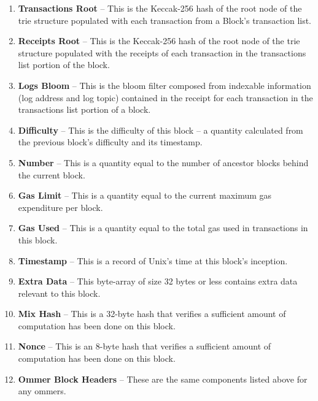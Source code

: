 \documentclass[10pt,a4paper,leqno,bibliography=totoc]{scrartcl}
\newenvironment{alphafootnotes}
{\par\edef\savedfootnotenumber{\number\value{footnote}}
\renewcommand{\thefootnote}{\alph{footnote}}
\setcounter{footnote}{0}}
{\par\setcounter{footnote}{\savedfootnotenumber}}
\begin{document}
\begin{alphafootnotes}
\begin{multicols*}{2}
\begin{enumerate}
					\item \textbf{Transactions Root} -- This is the Keccak-256 hash of the root node of the trie structure populated with each transaction from a Block's transaction list.
					\item \textbf{Receipts Root} -- This is the Keccak-256 hash of the root node of the trie structure populated with the receipts of each transaction in the transactions list portion of the block.
					\item \textbf{Logs Bloom} -- This is the bloom filter composed from indexable information (log address and log topic) contained in the receipt for each transaction in the transactions list portion of a block.
					\item \textbf{Difficulty} -- This is the difficulty of this block -- a quantity calculated from the previous block's difficulty and its timestamp.

					\item \textbf{Number} -- This is a quantity equal to the number of ancestor blocks behind the current block.
					\item \textbf{Gas Limit} -- This is a quantity equal to the current maximum gas expenditure per block.
					\item \textbf{Gas Used} -- This is a quantity equal to the total gas used in transactions in this block.
					\item \textbf{Timestamp} -- This is a record of Unix's time at this block's inception.
					

					\item \textbf{Extra Data} -- This byte-array of size 32 bytes or less contains extra data relevant to this block.
					\item \textbf{Mix Hash} -- This is a 32-byte hash that verifies a sufficient amount of computation has been done on this block.
					\item \textbf{Nonce} -- This is an 8-byte hash that verifies a sufficient amount of computation has been done on this block.
					\item \textbf{Ommer Block Headers} -- These are the same components listed above for any ommers.
				


\end{enumerate}
\end{multicols*}
\end{alphafootnotes}
\end{document}
